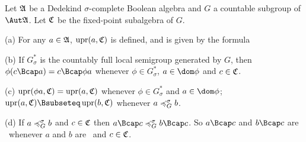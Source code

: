 


   Let $\frak A$ be a
Dedekind $\sigma$-complete Boolean algebra and $G$ a countable subgroup
of $\Aut\frak A$.   Let $\frak C$ be the fixed-point subalgebra of $G$.

(a) For any $a\in\frak A$, $\mathop{\text{upr}}(a,\frak C)$ is
defined, and is given by the formula


(b) If $G^*_{\sigma}$ is the countably full local semigroup generated by
$G$, then $\phi(c\Bcap a)=c\Bcap\phi a$ whenever
$\phi\in G^*_{\sigma}$, $a\in\dom\phi$ and $c\in\frak C$.

(c) $\mathop{\text{upr}}(\phi a,\frak C)=\mathop{\text{upr}}(a,\frak C)$ whenever
$\phi\in G^*_{\sigma}$ and $a\in\dom\phi$;
$\upr(a,\frak C)\Bsubseteq\upr(b,\frak C)$ whenever
$a\preccurlyeq^{\sigma}_G b$.

(d) If $a\preccurlyeq^{\sigma}_G b$ and $c\in\frak C$ then $a\Bcap c\psG b\Bcap c$.
So $a\Bcap c$ and $b\Bcap c$ are \Gse\ whenever $a$ and $b$ are
\Gse\ and $c\in\frak C$.

